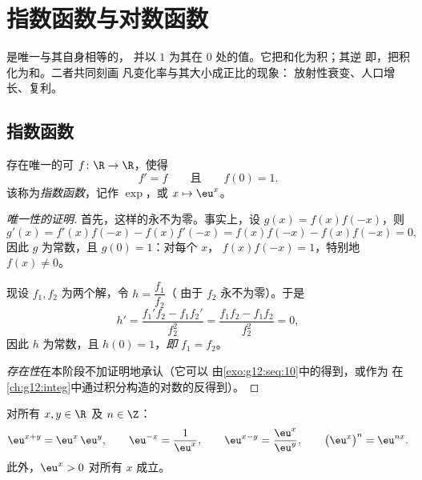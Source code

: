 \chapter{指数函数与对数函数}\label{ch:g12:exp}

是唯一与其自身相等的，
并以 $1$ 为其在 $0$ 处的值。它把和化为积；其逆
即，把积化为和。二者共同刻画
凡变化率与其大小成正比的现象：
放射性衰变、人口增长、复利。

\section{指数函数}

\begin{theorem}[存在性与唯一性]\label{thm:g12:exp:existence}
存在唯一的可 $f \colon \R \to \R$，使得
\[
f' = f \qquad\text{且}\qquad f(0) = 1 .
\]
该称为\emph{指数函数}，记作
$\exp$，或 $x \mapsto \eu^x$。
\end{theorem}

\begin{proof}[唯一性的证明]
首先，这样的永不为零。事实上，设
$g(x) = f(x)f(-x)$，则
\[
g'(x) = f'(x)f(-x) - f(x)f'(-x) = f(x)f(-x) - f(x)f(-x) = 0,
\]
因此 $g$ 为常数，且 $g(0) = 1$：对每个 $x$，
$f(x)f(-x) = 1$，特别地 $f(x) \neq 0$。

现设 $f_1, f_2$ 为两个解，令 $h = \dfrac{f_1}{f_2}$（
由于 $f_2$ 永不为零）。于是
\[
h' = \frac{f_1' f_2 - f_1 f_2'}{f_2^2} = \frac{f_1 f_2 - f_1 f_2}{f_2^2} = 0,
\]
因此 $h$ 为常数，且 $h(0) = 1$，\emph{即} $f_1 = f_2$。

\emph{存在性}在本阶段不加证明地承认（它可以
由\cref{exo:g12:seq:10}中的得到，或作为
在\cref{ch:g12:integ}中通过积分构造的对数的反得到）。
\end{proof}

\begin{proposition}[函数方程]\label{prop:g12:exp:funceq}
对所有 $x, y \in \R$ 及 $n \in \Z$：
\[
\eu^{x+y} = \eu^x\,\eu^y, \qquad
\eu^{-x} = \frac{1}{\eu^x}, \qquad
\eu^{x-y} = \frac{\eu^x}{\eu^y}, \qquad
\bigl(\eu^{x}\bigr)^n = \eu^{nx}.
\]
此外，$\eu^x > 0$ 对所有 $x$ 成立。
\end{proposition}

